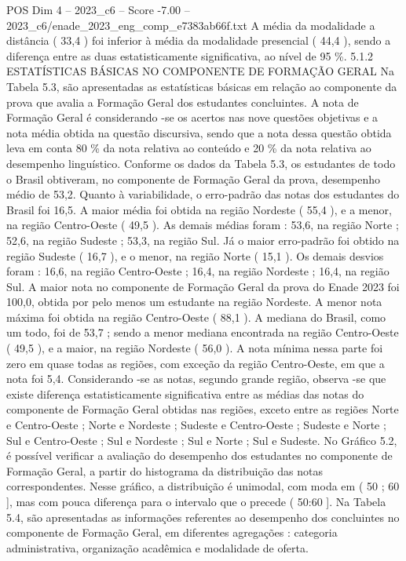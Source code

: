 \begin{textsample}{POS Dim 4 – 2023\_c6 – Score -7.00 – 2023\_c6/enade\_2023\_eng\_comp\_e7383ab66f.txt}
A média da modalidade a distância ( 33,4 ) foi inferior à média da modalidade presencial ( 44,4 ), sendo a diferença entre as duas estatisticamente significativa, ao nível de 95 \%. 5.1.2 ESTATÍSTICAS BÁSICAS NO COMPONENTE DE FORMAÇÃO GERAL Na Tabela 5.3, são apresentadas as estatísticas básicas em relação ao componente da prova que avalia a Formação Geral dos estudantes concluintes.
A nota de Formação Geral é considerando -se os acertos nas nove questões objetivas e a nota média obtida na questão discursiva, sendo que a nota dessa questão obtida leva em conta 80 \% da nota relativa ao conteúdo e 20 \% da nota relativa ao desempenho linguístico.
Conforme os dados da Tabela 5.3, os estudantes de todo o Brasil obtiveram, no componente de Formação Geral da prova, desempenho médio de 53,2.
Quanto à variabilidade, o erro-padrão das notas dos estudantes do Brasil foi 16,5.
A maior média foi obtida na região Nordeste ( 55,4 ), e a menor, na região Centro-Oeste ( 49,5 ).
As demais médias foram : 53,6, na região Norte ; 52,6, na região Sudeste ; 53,3, na região Sul.
Já o maior erro-padrão foi obtido na região Sudeste ( 16,7 ), e o menor, na região Norte ( 15,1 ).
Os demais desvios foram : 16,6, na região Centro-Oeste ; 16,4, na região Nordeste ; 16,4, na região Sul.
A maior nota no componente de Formação Geral da prova do Enade 2023 foi 100,0, obtida por pelo menos um estudante na região Nordeste.
A menor nota máxima foi obtida na região Centro-Oeste ( 88,1 ).
A mediana do Brasil, como um todo, foi de 53,7 ; sendo a menor mediana encontrada na região Centro-Oeste ( 49,5 ), e a maior, na região Nordeste ( 56,0 ).
A nota mínima nessa parte foi zero em quase todas as regiões, com exceção da região Centro-Oeste, em que a nota foi 5,4.
Considerando -se as notas, segundo grande região, observa -se que existe diferença estatisticamente significativa entre as médias das notas do componente de Formação Geral obtidas nas regiões, exceto entre as regiões Norte e Centro-Oeste ; Norte e Nordeste ; Sudeste e Centro-Oeste ; Sudeste e Norte ; Sul e Centro-Oeste ; Sul e Nordeste ; Sul e Norte ; Sul e Sudeste.
No Gráfico 5.2, é possível verificar a avaliação do desempenho dos estudantes no componente de Formação Geral, a partir do histograma da distribuição das notas correspondentes.
Nesse gráfico, a distribuição é unimodal, com moda em ( 50 ; 60 ], mas com pouca diferença para o intervalo que o precede ( 50:60 ].
Na Tabela 5.4, são apresentadas as informações referentes ao desempenho dos concluintes no componente de Formação Geral, em diferentes agregações : categoria administrativa, organização acadêmica e modalidade de oferta.

\end{textsample}
